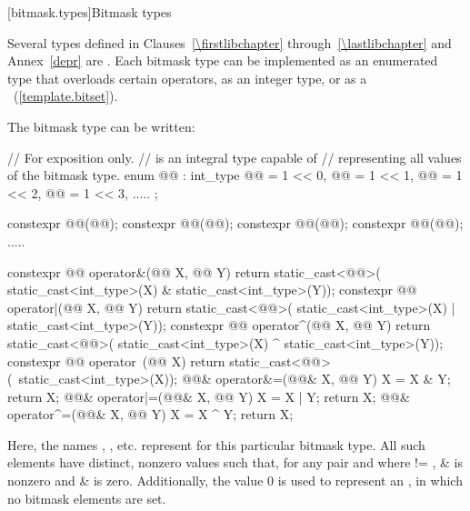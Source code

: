 [bitmask.types]{Bitmask types}

\pnum
Several types defined in Clauses~\ref{\firstlibchapter} through~\ref{\lastlibchapter}
and Annex~\ref{depr} are
.
%
Each bitmask type can be implemented as an
enumerated type that overloads certain operators, as an integer type,
or as a
~(\ref{template.bitset}).
%

\pnum
The bitmask type  can be written:

\begin{codeblock}
// For exposition only.
//  is an integral type capable of
// representing all values of the bitmask type.
enum @@ : int_type {
  @@ = 1 << 0, @@ = 1 << 1, @@ = 1 << 2, @@ = 1 << 3, .....
};

constexpr @@(@@);
constexpr @@(@@);
constexpr @@(@@);
constexpr @@(@@);
  .....

constexpr @@ operator&(@@ X, @@ Y) {
  return static_cast<@@>(
    static_cast<int_type>(X) & static_cast<int_type>(Y));
}
constexpr @@ operator|(@@ X, @@ Y) {
  return static_cast<@@>(
    static_cast<int_type>(X) | static_cast<int_type>(Y));
}
constexpr @@ operator^(@@ X, @@ Y){
  return static_cast<@@>(
    static_cast<int_type>(X) ^ static_cast<int_type>(Y));
}
constexpr @@ operator~(@@ X){
  return static_cast<@@>(~static_cast<int_type>(X));
}
@@& operator&=(@@& X, @@ Y){
  X = X & Y; return X;
}
@@& operator|=(@@& X, @@ Y) {
  X = X | Y; return X;
}
@@& operator^=(@@& X, @@ Y) {
  X = X ^ Y; return X;
}
\end{codeblock}

\pnum
Here, the names , , etc. represent
for this particular bitmask type.
%
All such elements have distinct, nonzero values such that, for any pair 
and  where  != ,  \&  is nonzero and
 \&  is zero.
%
Additionally, the value 0 is used to represent an , in which no
bitmask elements are set.

